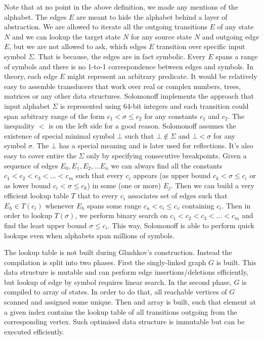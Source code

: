 \documentclass[12pt]{article}
\begin{document}
Note that at no point in the above definition, we made any mentions of the alphabet. The edges $E$ are meant to hide the alphabet behind a layer of abstraction. We are allowed to iterate all the outgoing transitions $E$ of any state $N$ and we can lookup the target state $N$ for any source state $N$ and outgoing edge $E$, but we are not allowed to ask, which edges $E$ transition over specific input symbol $\Sigma$. That is because, the edges are in fact symbolic. Every $E$ spans a range of symbols and there is no 1-to-1 correspondence between edges and symbols. In theory, each edge $E$ might represent an arbitrary predicate. It would be relatively easy to assemble transducers that work over real or complex numbers, trees, matrices or any other data structures. Solomonoff implements the approach that input alphabet $\Sigma$ is represented using 64-bit integers and each transition could span arbitrary range of the form $c_1 < \sigma \le c_2$ for any constants $c_1$ and $c_2$. The inequality $<$ is on the left side for a good reason. Solomonoff assumes the existence of special minimal symbol $\bot$ such that $\bot \notin \Sigma$ and $\bot < \sigma$ for any symbol $\sigma$. The $\bot$ has a special meaning and is later used for reflections. It's also easy to cover entire the $\Sigma$ only by specifying  consecutive breakpoints. Given a sequence of edges  $E_0,E_1,E_2,...E_n$ we can always find all the constants $c_1<c_2<c_3<...<c_m$ such that every $c_i$ appears (as upper bound $c_k<\sigma\le c_i$  or as  lower bound $c_i<\sigma\le c_k$) in some (one or more) $E_j$. Then we can build a very efficient lookup table $T$ that to every $c_i$ associates set of edges such that $E_h \in T(c_i)$ whenever $E_h$ spans some range $c_u < c_i \le c_v $ containing $c_i$. Then in order to lookup $T(\sigma)$, we perform binary search on $c_1<c_2<c_3<...<c_m$ and find the least upper bound $\sigma \le c_i$. This way, Solomonoff is able to perform quick lookups even when alphabets span millions of symbols.

The lookup table is not built during Glushkov's construction. Instead the compilation is split into two phases. First the singly-linked graph $G$ is built. This data structure is mutable and can perform edge insertions/deletions efficiently, but lookup of edge by symbol requires linear search. In the second phase, $G$ is compiled to array of states. In order to do that, all reachable vertices of $G$ scanned and assigned some unique. Then and array is built, such that element at a given index contains the lookup table of all transitions outgoing from the corresponding vertex. Such optimised data structure is immutable but can be executed efficiently.  
\end{document}
